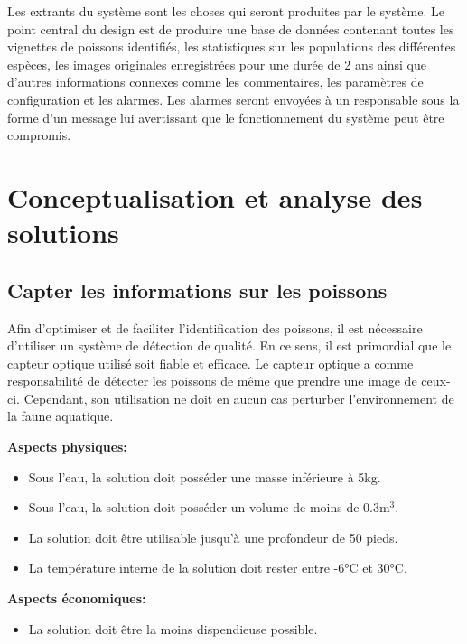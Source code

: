 Les extrants du système sont les choses qui seront produites par le système. Le point central du design est de produire une base de données contenant toutes les vignettes de poissons identifiés, les statistiques sur les populations des différentes espèces, les images originales enregistrées pour une durée de 2 ans ainsi que d'autres informations connexes comme les commentaires, les paramètres de configuration et les alarmes. Les alarmes seront envoyées à un responsable sous la forme d'un message lui avertissant que le fonctionnement du système peut être compromis.

\pagebreak

\section{Conceptualisation et analyse des solutions}

\subsection{Capter les informations sur les poissons}

Afin d'optimiser et de faciliter l'identification des poissons, il est nécessaire d'utiliser un système de détection de qualité. En ce sens, il est primordial que le capteur optique utilisé soit fiable et efficace. Le capteur optique a comme responsabilité de détecter les poissons de même que prendre une image de ceux-ci. Cependant, son utilisation ne doit en aucun cas perturber l'environnement de la faune aquatique. \vspace{5mm}


\textbf{Aspects physiques:}
\begin{itemize}[label = {--}]
    \item Sous l'eau, la solution doit posséder une masse inférieure à 5kg.
    \item Sous l'eau, la solution doit posséder un volume de moins de 0.3m$^3$.
    \item La solution doit être utilisable jusqu'à une profondeur de 50 pieds.
    \item La température interne de la solution doit rester entre -6°C et 30°C.
\end{itemize}

\textbf{Aspects économiques:}
\begin{itemize}[label = {--}]
    \item La solution doit être la moins dispendieuse possible.
\end{itemize}

